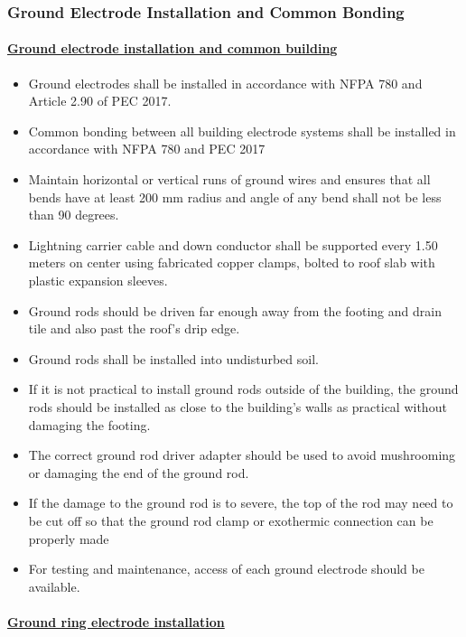 \subsubsection{Ground Electrode Installation and Common Bonding }

\paragraph{\underline{Ground electrode installation and common building}}
\begin{itemize}
\item Ground electrodes shall be installed in accordance with NFPA 780 and Article 2.90 of PEC 2017. 
\item 	Common bonding between all building electrode systems shall be installed in accordance with NFPA 780 and PEC 2017
\item 	Maintain horizontal or vertical runs of ground wires and ensures that all bends have at least 200 mm radius and angle of any bend shall not be less than 90 degrees. 

\item  	Lightning carrier cable and down conductor shall be supported every 1.50 meters on center using fabricated copper clamps, bolted to roof slab with plastic expansion sleeves.

\item  	Ground rods should be driven far enough away from the footing and drain tile and also past the roof’s drip edge.
\item 	Ground rods shall be installed into undisturbed soil. 
\item  	If it is not practical to install ground rods outside of the building, the ground rods should be installed as close to the building’s walls as practical without damaging the footing.
\item 	The correct ground rod driver adapter should be used to avoid mushrooming or damaging the end of the ground rod.
\item  	If the damage to the ground rod is to severe, the top of the rod may need to be cut off so that the ground rod clamp or exothermic connection can be properly made
\item 	For testing and maintenance, access of each ground electrode should be available.

\end{itemize}

\paragraph{\underline{Ground ring electrode installation}}


